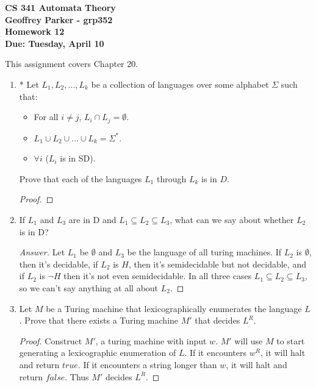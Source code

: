 \documentclass[10pt]{article}
\begin{document}
\begin{flushleft}
\textbf{\noindent
CS 341 Automata Theory \\
Geoffrey Parker - grp352\\
Homework 12 \\
Due: Tuesday, April 10}\\
\end{flushleft}
\noindent
This assignment covers Chapter 20.\\

\begin{enumerate}[1)]


\item
* Let $L_1, L_2, \ldots , L_k$ be a collection of languages over some alphabet $\Sigma$ such that:
\begin{itemize}
\item
For all $i \neq j$, $L_i \cap L_j = \emptyset$.
\item
$L_1 \cup L_2 \cup \dots \cup L_k = \Sigma ^*$.
\item
$\forall i$ ($L_i$ is in SD).
\end{itemize}
Prove that each of the languages $L_1$ through $L_k$ is in $D$.
\begin{proof}[Proof]
\end{proof}


\item
If $L_1$ and $L_3$ are in D and $L_1 \subseteq L_2 \subseteq L_3$, what can we say about whether $L_2$ is in D?
\begin{proof}[Answer]
Let $L_1$ be $\emptyset$ and $L_3$ be the language of all turing machines.  If $L_2$ is $\emptyset$, then it's decidable, if $L_2$ is $H$, then it's semidecidable but not decidable, and if $L_2$ is $\lnot H$ then it's not even semidecidable.  In all three cases $L_1 \subseteq L_2 \subseteq L_3$, so we can't say anything at all about $L_2$.
\end{proof}


\item
Let $M$ be a Turing machine that lexicographically enumerates the language $L$. Prove that there exists a Turing
machine $M'$ that decides $L^R$.
\begin{proof}[Proof]
Construct $M'$, a turing machine with input $w$.  $M'$ will use $M$ to start generating a lexicographic enumeration of $L$. If it encounters $w^R$, it will halt and return $true$.  If it encounters a string longer than $w$, it will halt and return $false$.  Thus $M'$ decides $L^R$.
\end{proof}



\end{enumerate}
\end{document}
